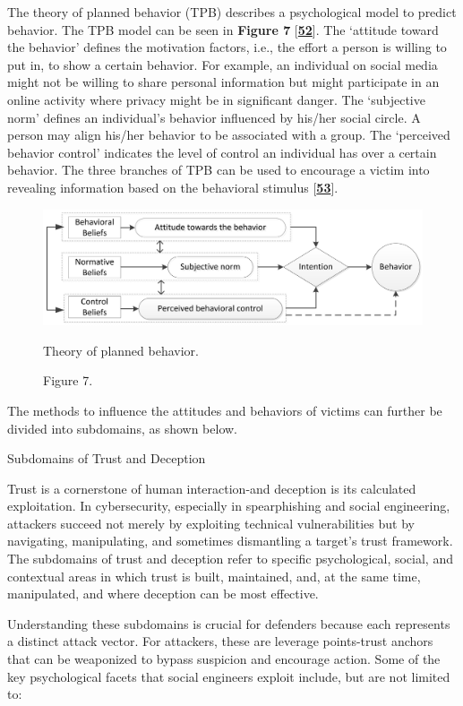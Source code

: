 The theory of planned behavior (TPB) describes a psychological model to predict behavior. The TPB model can be seen in \textbf{Figure 7} [\href{https://www.mdpi.com/2076-3417/12/12/6042\#B52-applsci-12-06042}{\textbf{52}}]. The ‘attitude toward the behavior’ defines the motivation factors, i.e., the effort a person is willing to put in, to show a certain behavior. For example, an individual on social media might not be willing to share personal information but might participate in an online activity where privacy might be in significant danger. The ‘subjective norm’ defines an individual’s behavior influenced by his/her social circle. A person may align his/her behavior to be associated with a group. The ‘perceived behavior control’ indicates the level of control an individual has over a certain behavior. The three branches of TPB can be used to encourage a victim into revealing information based on the behavioral stimulus [\href{https://www.mdpi.com/2076-3417/12/12/6042\#B53-applsci-12-06042}{\textbf{53}}].
\begin{figure}
    \justifying
    \includegraphics[width=0.75\linewidth]{theory.png}
    \caption{Figure 7.} Theory of planned behavior.
    \label{fig:placeholder}
\end{figure}

The methods to influence the attitudes and behaviors of victims can further be divided into subdomains, as shown below.

Subdomains of Trust and Deception

Trust is a cornerstone of human interaction-and deception is its calculated exploitation. In cybersecurity, especially in spearphishing and social engineering, attackers succeed not merely by exploiting technical vulnerabilities but by navigating, manipulating, and sometimes dismantling a target's trust framework. The subdomains of trust and deception refer to specific psychological, social, and contextual areas in which trust is built, maintained, and, at the same time, manipulated, and where deception can be most effective.

Understanding these subdomains is crucial for defenders because each represents a distinct attack vector. For attackers, these are leverage points-trust anchors that can be weaponized to bypass suspicion and encourage action. Some of the key psychological facets that social engineers exploit include, but are not limited to:

